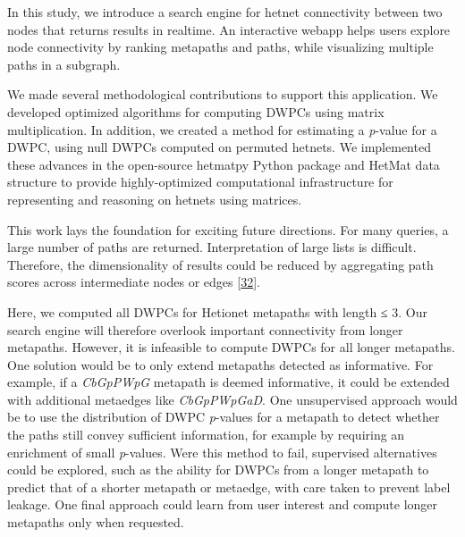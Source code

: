 In this study, we introduce a search engine for hetnet connectivity between two nodes that returns results in realtime.
An interactive webapp helps users explore node connectivity by ranking metapaths and paths,
while visualizing multiple paths in a subgraph.

We made several methodological contributions to support this application.
We developed optimized algorithms for computing DWPCs using matrix multiplication.
In addition, we created a method for estimating a \emph{p}-value for a DWPC,
using null DWPCs computed on permuted hetnets.
We implemented these advances in the open-source hetmatpy Python package and HetMat data structure to provide highly-optimized computational infrastructure for representing and reasoning on hetnets using matrices.

This work lays the foundation for exciting future directions.
For many queries, a large number of paths are returned.
Interpretation of large lists is difficult.
Therefore, the dimensionality of results could be reduced by aggregating path scores across intermediate nodes or edges {[}\protect\hyperlink{ref-1693YErZj}{32}{]}.

Here, we computed all DWPCs for Hetionet metapaths with length ≤ 3.
Our search engine will therefore overlook important connectivity from longer metapaths.
However, it is infeasible to compute DWPCs for all longer metapaths.
One solution would be to only extend metapaths detected as informative.
For example, if a \emph{CbGpPWpG} metapath is deemed informative,
it could be extended with additional metaedges like \emph{CbGpPWpGaD}.
One unsupervised approach would be to use the distribution of DWPC \emph{p}-values for a metapath to detect whether the paths still convey sufficient information, for example by requiring an enrichment of small \emph{p}-values.
Were this method to fail, supervised alternatives could be explored,
such as the ability for DWPCs from a longer metapath to predict that of a shorter metapath or metaedge,
with care taken to prevent label leakage.
One final approach could learn from user interest and compute longer metapaths only when requested.

